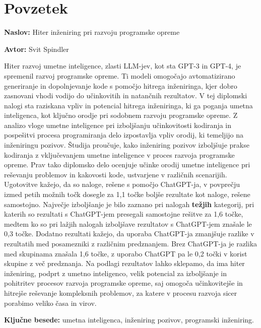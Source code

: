 \documentclass[a4paper,12pt,openright]{book}
\newcommand{\ttitle}{Hiter inženiring pri razvoju programske opreme}
\newcommand{\tauthor}{Svit Spindler}
\newcommand{\tkeywords}{umetna inteligenca, inženiring pozivov, programski inženiring}
\newcommand{\clearemptydoublepage}{\newpage{\pagestyle{empty}\cleardoublepage}}
\begin{document}
\clearemptydoublepage

{}
\chapter*{Povzetek}

\noindent\textbf{Naslov:} \ttitle
\bigskip

\noindent\textbf{Avtor:} \tauthor
\bigskip

Hiter razvoj umetne inteligence, zlasti LLM-jev, kot sta GPT-3 in GPT-4, je spremenil razvoj programske opreme. Ti modeli omogočajo avtomatizirano generiranje in dopolnjevanje kode s pomočjo hitrega inženiringa, kjer dobro zasnovani vhodi vodijo do učinkovitih in natančnih rezultatov. V tej diplomski nalogi sta raziskana vpliv in potencial hitrega inženiringa, ki ga poganja umetna inteligenca, kot ključno orodje pri sodobnem razvoju programske opreme. Z analizo vloge umetne inteligence pri izboljšanju učinkovitosti kodiranja in pospešitvi procesa programiranja delo izpostavlja vpliv orodij, ki temeljijo na inženiringu pozivov. Študija proučuje, kako inženiring pozivov izboljšuje prakse kodiranja z vključevanjem umetne inteligence v proces razvoja programske opreme. Prav tako diplomsko delo ocenjuje učinke orodij umetne inteligence pri reševanju problemov in kakovosti kode, ustvarjene v različnih scenarijih. 
Ugotovitve kažejo, da so naloge, rešene s pomočjo ChatGPT-ja, v povprečju izmed petih možnih točk dosegle za 1,1 točke boljše rezultate kot naloge, rešene samostojno. 
Največje izboljšanje je bilo zaznano pri nalogah \textbf{težjih} kategorij, pri katerih so rezultati s ChatGPT-jem presegali samostojne rešitve za 1,6 točke, medtem ko so pri lažjih nalogah izboljšave rezultatov s ChatGPT-jem znašale le 0,3 točke.
Dodatno rezultati kažejo, da uporaba ChatGPT-ja zmanjšuje razlike v rezultatih med posamezniki z različnim predznanjem. Brez ChatGPT-ja je razlika med skupinama znašala 1,6 točke, z uporabo ChatGPT pa le 0,2 točki v korist skupine z več predznanja. Na podlagi rezultatov lahko sklepamo, da ima hiter inženiring, podprt z umetno inteligenco, velik potencial za izboljšanje in pohitritev procesov razvoja programske opreme, saj omogoča učinkovitejše in hitrejše reševanje kompleksnih problemov, za katere v procesu razvoja sicer porabimo veliko časa in virov.

\bigskip

\noindent\textbf{Ključne besede:} \tkeywords.
\clearemptydoublepage
\end{document}
